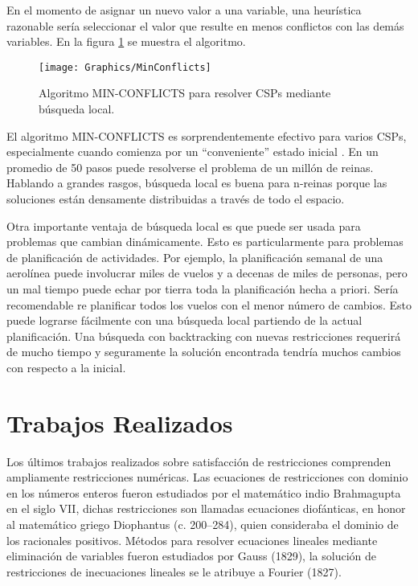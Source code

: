 En el momento de asignar un nuevo valor a una variable, una heur\'istica razonable ser\'ia seleccionar el valor que resulte en menos conflictos con las dem\'as variables. En la figura \ref{MinConflicts} se muestra el algoritmo.

\begin{figure}[h]
	\begin{center}
		\texttt{[image: Graphics/MinConflicts]}
		\caption{Algoritmo MIN-CONFLICTS para resolver CSPs mediante b\'usqueda local.}
		\label{MinConflicts}
	\end{center}	
\end{figure}

El algoritmo MIN-CONFLICTS es sorprendentemente efectivo para varios CSPs, especialmente cuando comienza por un ``conveniente'' estado inicial \cite{Artificial Intelligence Book}. En un promedio de 50 pasos puede resolverse el problema de un mill\'on de reinas. Hablando a grandes rasgos, b\'usqueda local es buena para n-reinas porque las soluciones est\'an densamente distribuidas a trav\'es de todo el espacio.

Otra importante ventaja de b\'usqueda local es que puede ser usada para problemas que cambian din\'amicamente. Esto es particularmente para problemas de planificaci\'on de actividades. Por ejemplo, la planificaci\'on semanal de una aerol\'inea puede involucrar miles de vuelos y a decenas de miles de personas, pero un mal tiempo puede echar por tierra toda la planificaci\'on hecha a priori. Ser\'ia recomendable re planificar todos los vuelos con el menor n\'umero de cambios. Esto puede lograrse f\'acilmente con una b\'usqueda local partiendo de la actual planificaci\'on. Una b\'usqueda con backtracking con nuevas restricciones requerir\'a de mucho tiempo y seguramente la soluci\'on encontrada tendr\'ia muchos cambios con respecto a la inicial.

\section{Trabajos Realizados}

Los \'ultimos trabajos realizados sobre satisfacci\'on de restricciones comprenden ampliamente restricciones num\'ericas. Las ecuaciones de restricciones con dominio en los n\'umeros enteros fueron estudiados por el matem\'atico indio Brahmagupta en el siglo VII, dichas restricciones son llamadas ecuaciones diofánticas, en honor al matem\'atico griego Diophantus (c. 200–284), quien consideraba el dominio de los racionales positivos. M\'etodos para resolver ecuaciones lineales  mediante eliminaci\'on de variables fueron estudiados por Gauss (1829), la soluci\'on de restricciones de inecuaciones lineales se le atribuye a Fourier (1827).

